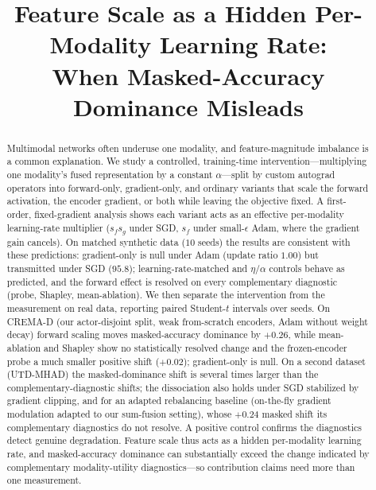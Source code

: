 \documentclass[conference]{IEEEtran}
\begin{document}
\title{Feature Scale as a Hidden Per-Modality Learning Rate:\\ When Masked-Accuracy Dominance Misleads}

\author{
\and
{}
}

\maketitle

\begin{abstract}
Multimodal networks often underuse one modality, and feature-magnitude imbalance is a common explanation. We study a controlled, training-time intervention---multiplying one modality's fused representation by a constant $\alpha$---split by custom autograd operators into forward-only, gradient-only, and ordinary variants that scale the forward activation, the encoder gradient, or both while leaving the objective fixed. A first-order, fixed-gradient analysis shows each variant acts as an effective per-modality learning-rate multiplier ($s_f s_g$ under SGD, $s_f$ under small-$\epsilon$ Adam, where the gradient gain cancels). On matched synthetic data ($10$ seeds) the results are consistent with these predictions: gradient-only is null under Adam (update ratio $1.00$) but transmitted under SGD ($95.8$); learning-rate-matched and $\eta/\alpha$ controls behave as predicted, and the forward effect is resolved on every complementary diagnostic (probe, Shapley, mean-ablation). We then separate the intervention from the measurement on real data, reporting paired Student-$t$ intervals over seeds. On CREMA-D (our actor-disjoint split, weak from-scratch encoders, Adam without weight decay) forward scaling moves masked-accuracy dominance by $+0.26$, while mean-ablation and Shapley show no statistically resolved change and the frozen-encoder probe a much smaller positive shift ($+0.02$); gradient-only is null. On a second dataset (UTD-MHAD) the masked-dominance shift is several times larger than the complementary-diagnostic shifts; the dissociation also holds under SGD stabilized by gradient clipping, and for an adapted rebalancing baseline (on-the-fly gradient modulation adapted to our sum-fusion setting), whose $+0.24$ masked shift its complementary diagnostics do not resolve. A positive control confirms the diagnostics detect genuine degradation. Feature scale thus acts as a hidden per-modality learning rate, and masked-accuracy dominance can substantially exceed the change indicated by complementary modality-utility diagnostics---so contribution claims need more than one measurement.
\end{abstract}
\end{document}

